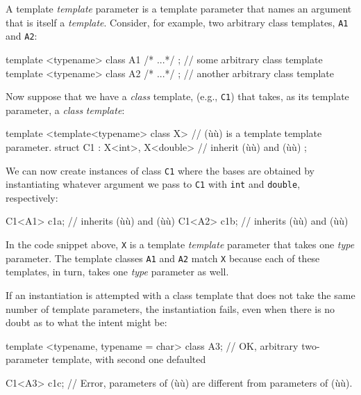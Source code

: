 A template \emph{template} parameter is a template parameter that names
an argument that is itself a \emph{template}. Consider, for example, two
arbitrary class templates, \lstinline!A1! and \lstinline!A2!:

\begin{emcppslisting}
template <typename> class A1 {/* ...*/ };  // some arbitrary class template
template <typename> class A2 {/* ...*/ };  // another arbitrary class template
\end{emcppslisting}
    

\noindent Now suppose that we have a \emph{class} template, (e.g., \lstinline!C1!)
that takes, as its template parameter, a \emph{class} \emph{template}:

\begin{emcppslisting}
template <template<typename> class X>  // (ù{}ù) is a template template parameter.
struct C1 : X<int>, X<double>          // inherit (ù{}ù) and (ù{}ù)
{ };
\end{emcppslisting}
    

\noindent We can now create instances of class \lstinline!C1! where the bases are
obtained by instantiating whatever argument we pass to \lstinline!C1! with
\lstinline!int! and \lstinline!double!, respectively:

\begin{emcppslisting}
C1<A1> c1a;  // inherits (ù{}ù) and (ù{}ù)
C1<A2> c1b;  // inherits (ù{}ù) and (ù{}ù)
\end{emcppslisting}
    

\noindent In the code snippet above, \lstinline!X! is a template \emph{template}
parameter that takes one \emph{type} parameter. The template classes
\lstinline!A1! and \lstinline!A2! match \lstinline!X! because each of these
templates, in turn, takes one \emph{type} parameter as well.

If an instantiation is attempted with a class template that does not
take the same number of template parameters, the instantiation fails,
even when there is no doubt as to what the intent might be:

\begin{emcppslisting}
template <typename, typename = char>
class A3;    // OK, arbitrary two-parameter template, with second one defaulted

C1<A3> c1c;  // Error, parameters of (ù{}ù) are different from parameters of (ù{}ù).
\end{emcppslisting}
    

